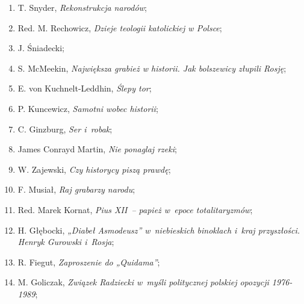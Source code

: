 \documentclass[a4paper,11pt]{article}
\begin{document}
\begin{enumerate}
\item T. Snyder, \textit{Rekonstrukcja narodów};



\item Red. M. Rechowicz, \textit{Dzieje teologii katolickiej w Polsce};



\item J. Śniadecki;



\item S. McMeekin, \textit{Największa grabież w historii. Jak bolszewicy
    złupili Rosję};



\item E. von Kuchnelt-Leddhin, \textit{Ślepy tor};



\item P. Kuncewicz, \textit{Samotni wobec historii};



\item C. Ginzburg, \textit{Ser i~robak};



\item James Conrayd Martin, \textit{Nie ponaglaj rzeki};



\item W. Zajewski, \textit{Czy historycy piszą prawdę};



\item F. Musiał, \textit{Raj grabarzy narodu};



\item Red. Marek Kornat, \textit{Pius XII~-- papież w~epoce
    totalitaryzmów};



\item H. Głębocki, \textit{„Diabeł Asmodeusz” w~niebieskich binoklach
    i~kraj przyszłości. Henryk Gurowski i~Rosja};



\item R. Fiegut, \textit{Zaproszenie do „Quidama”};



\item M. Goliczak, \textit{Związek Radziecki w~myśli politycznej
    polskiej opozycji 1976-1989};




\end{enumerate}
\end{document}
